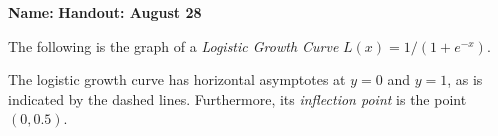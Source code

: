\documentclass{article}
\begin{document}
\noindent \textbf{Name:}\underline{\hspace{2in}} \hfill \textbf{Handout: August 28}
\vspace{1em}

The following is the graph of a \emph{Logistic Growth Curve} $L(x) = 1/(1 + e^{-x})$. 
\begin{center}
\end{center}
The logistic growth curve has horizontal asymptotes at $y = 0$ and $y=1$, as is indicated by the dashed lines. Furthermore, its \emph{inflection point} is the point $(0,0.5)$.
\end{document}

